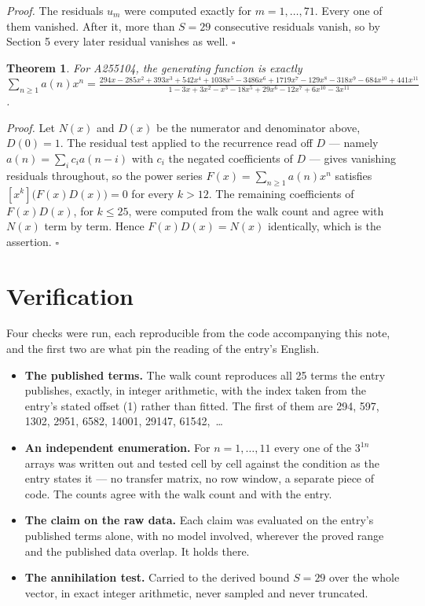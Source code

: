 \documentclass[11pt]{article}
\newtheorem{theorem}{Theorem}
\theoremstyle{definition}
\begin{document}
{\itshape Proof.} The residuals $u_m$ were computed exactly for $m = 1,\dots,71$. Every one of them vanished. After it, more than $S = 29$ consecutive residuals vanish, so by Section 5 every later residual vanishes as well. $\square$

\begin{theorem} For A255104, the generating function is exactly $\sum_{n\ge 1} a(n)x^n = \frac{294x - 285x^{2} + 393x^{3} + 542x^{4} + 1038x^{5} - 3486x^{6} + 1719x^{7} - 129x^{8} - 318x^{9} - 684x^{10} + 441x^{11}}{1 - 3x + 3x^{2} - x^{3} - 18x^{5} + 29x^{6} - 12x^{7} + 6x^{10} - 3x^{11}}$.\end{theorem}

{\itshape Proof.} Let $N(x)$ and $D(x)$ be the numerator and denominator above, $D(0)=1$. The residual test applied to the recurrence read off $D$ --- namely $a(n) = \sum_i c_i a(n-i)$ with $c_i$ the negated coefficients of $D$ --- gives vanishing residuals throughout, so the power series $F(x)=\sum_{n\ge 1}a(n)x^n$ satisfies $[x^k]\bigl(F(x)D(x)\bigr) = 0$ for every $k > 12$. The remaining coefficients of $F(x)D(x)$, for $k \le 25$, were computed from the walk count and agree with $N(x)$ term by term. Hence $F(x)D(x) = N(x)$ identically, which is the assertion. $\square$

\section{Verification}

Four checks were run, each reproducible from the code accompanying this note, and the first two are what pin the reading of the entry's English.

\begin{itemize}

\item {\bfseries The published terms.} The walk count reproduces all 25 terms the entry publishes, exactly, in integer arithmetic, with the index taken from the entry's stated offset (1) rather than fitted. The first of them are 294, 597, 1302, 2951, 6582, 14001, 29147, 61542,~\dots

\item {\bfseries An independent enumeration.} For $n = 1,\dots,11$ every one of the $3^{1n}$ arrays was written out and tested cell by cell against the condition as the entry states it --- no transfer matrix, no row window, a separate piece of code. The counts agree with the walk count and with the entry.

\item {\bfseries The claim on the raw data.} Each claim was evaluated on the entry's published terms alone, with no model involved, wherever the proved range and the published data overlap. It holds there.

\item {\bfseries The annihilation test.} Carried to the derived bound $S = 29$ over the whole vector, in exact integer arithmetic, never sampled and never truncated.

\end{itemize}
\end{document}
